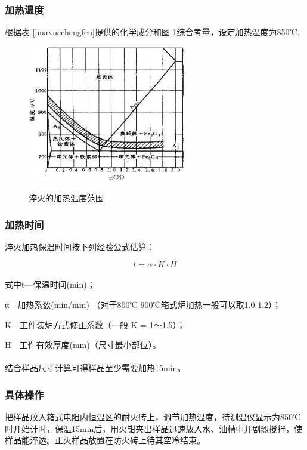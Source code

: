 \documentclass[12pt]{ctexart}
\begin{document}
\subsubsection{加热温度}
根据表 \ref{huaxuechengfen}提供的化学成分和图 \ref{cuihuowendu}综合考量，设定加热温度为850℃.
\newpage
\begin{figure}[h]
  \centering
  \includegraphics[width=7cm]{cuihuowendu.jpg}\\
  \caption{淬火的加热温度范围}\label{cuihuowendu}
\end{figure}

\subsubsection{加热时间}
淬火加热保温时间按下列经验公式估算：

\[t = \alpha  \cdot K \cdot H\]

\paragraph{}
式中t—保温时间(min)；

    α—加热系数(min/mm) （对于800℃-900℃箱式炉加热一般可以取1.0-1.2）；

    K—工件装炉方式修正系数（一般 K = 1～1.5）；

    H—工件有效厚度(mm)（尺寸最小部位）。
\paragraph{}
结合样品尺寸计算可得样品至少需要加热15min。
\subsubsection{具体操作}
把样品放入箱式电阻内恒温区的耐火砖上，调节加热温度，待测温仪显示为850℃时开始计时，保温15min后，用火钳夹出样品迅速放入水、油槽中并剧烈搅拌，使样品能淬透。正火样品放置在防火砖上待其空冷结束。
\end{document}
